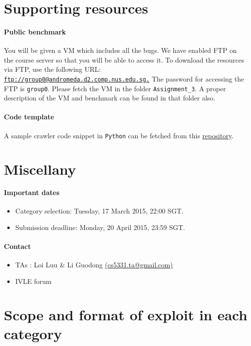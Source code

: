 \documentclass{article}[10pt]
\begin{document}
\section{Supporting resources}
\paragraph{Public benchmark} You will be given a VM which includes all the bugs. We have enabled FTP on 
the course server so that you will be able to access it. To download 
the resources via FTP, use the following URL: 
\href{ftp://group0@andromeda.d2.comp.nus.edu.sg}{\tt ftp://group0@andromeda.d2.comp.nus.edu.sg.}
The password for accessing the FTP is \texttt{group0}. Please fetch the VM in the folder {\tt Assignment\_3}. A proper description of the VM and benchmark can be found in that folder also.

\paragraph{Code template} A sample crawler code snippet in {\tt Python} can be fetched from this \href{https://github.com/Dexter-JS/Scanner}{repository}.

\section{Miscellany}
\paragraph{Important dates}
\begin{itemize}
	\item Category selection:  Tuesday, 17 March 2015,  22:00 SGT.
	\item Submission deadline: Monday, 20 April 2015, 23:59 SGT.
\end{itemize}

\paragraph{Contact}
\begin{itemize}
\item TAs : Loi Luu \& Li Guodong \href{mailto:cs5331.ta@gmail.com}{(cs5331.ta@gmail.com)}
\item IVLE forum
\end{itemize}

\section{Scope and format of exploit in each category}
\label{exploit-format}
\end{document}
